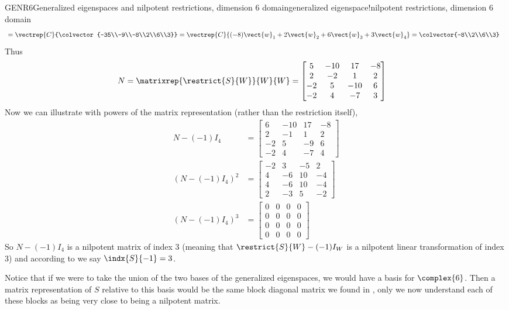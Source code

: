 \begin{example}{GENR6}{Generalized eigenspaces and nilpotent restrictions, dimension 6 domain}{generalized eigenspace!nilpotent restrictions, dimension 6 domain}
\begin{align*}
&=\vectrep{C}{\colvector{-35\\-9\\-8\\2\\6\\3}}
=\vectrep{C}{
(-8)\vect{w}_1+
2\vect{w}_2+
6\vect{w}_3+
3\vect{w}_4
}
=\colvector{-8\\2\\6\\3}
%
\end{align*}
%
Thus
%
\begin{align*}
N
&=\matrixrep{\restrict{S}{W}}{W}{W}
=
\begin{bmatrix}
 5 & -10 & 17 & -8 \\
 2 & -2 & 1 & 2 \\
 -2 & 5 & -10 & 6 \\
 -2 & 4 & -7 & 3
\end{bmatrix}
\end{align*}
%
Now we can illustrate  with powers of the matrix representation (rather than the restriction itself),
%
\begin{align*}
%
N-(-1)I_4
&=
\begin{bmatrix}
 6 & -10 & 17 & -8 \\
 2 & -1 & 1 & 2 \\
 -2 & 5 & -9 & 6 \\
 -2 & 4 & -7 & 4
\end{bmatrix}\\
%
\left(N-(-1)I_4\right)^2
&=
\begin{bmatrix}
 -2 & 3 & -5 & 2 \\
 4 & -6 & 10 & -4 \\
 4 & -6 & 10 & -4 \\
 2 & -3 & 5 & -2
\end{bmatrix}\\
%
\left(N-(-1)I_4\right)^3
&=
\begin{bmatrix}
 0 & 0 & 0 & 0 \\
 0 & 0 & 0 & 0 \\
 0 & 0 & 0 & 0 \\
 0 & 0 & 0 & 0
\end{bmatrix}
%
\end{align*}
%
So $N-(-1)I_4$ is a nilpotent matrix of index 3 (meaning that $\restrict{S}{W}-(-1)I_W$ is a nilpotent linear transformation of index 3) and according to  we say $\indx{S}{-1}=3$.\par
%
Notice that if we were to take the union of the two bases of the generalized eigenspaces, we would have a basis for $\complex{6}$.  Then a matrix representation of $S$ relative to this basis would be the same block diagonal matrix we found in , only we now understand each of these blocks as being very close to being a nilpotent matrix.
%
\end{example}
